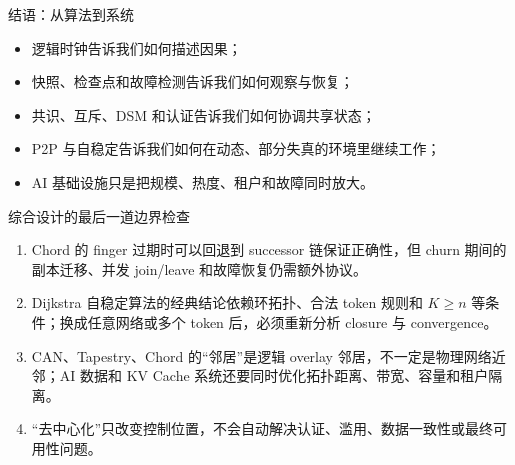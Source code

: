\documentclass[UTF8,fontset=none,aspectratio=169,10pt]{beamer}
\begin{document}
\begin{frame}{结语：从算法到系统}
\begin{itemize}
  \item 逻辑时钟告诉我们如何描述因果；
  \item 快照、检查点和故障检测告诉我们如何观察与恢复；
  \item 共识、互斥、DSM 和认证告诉我们如何协调共享状态；
  \item P2P 与自稳定告诉我们如何在动态、部分失真的环境里继续工作；
  \item AI 基础设施只是把规模、热度、租户和故障同时放大。
\end{itemize}
\vfill
{}
\end{frame}

\begin{frame}{综合设计的最后一道边界检查}
\small
\begin{enumerate}
  \item Chord 的 finger 过期时可以回退到 successor 链保证正确性，但 churn 期间的副本迁移、并发 join/leave 和故障恢复仍需额外协议。
  \item Dijkstra 自稳定算法的经典结论依赖环拓扑、合法 token 规则和 $K\ge n$ 等条件；换成任意网络或多个 token 后，必须重新分析 closure 与 convergence。
  \item CAN、Tapestry、Chord 的“邻居”是逻辑 overlay 邻居，不一定是物理网络近邻；AI 数据和 KV Cache 系统还要同时优化拓扑距离、带宽、容量和租户隔离。
  \item “去中心化”只改变控制位置，不会自动解决认证、滥用、数据一致性或最终可用性问题。
\end{enumerate}
\vfill
{}
\end{frame}
\end{document}
